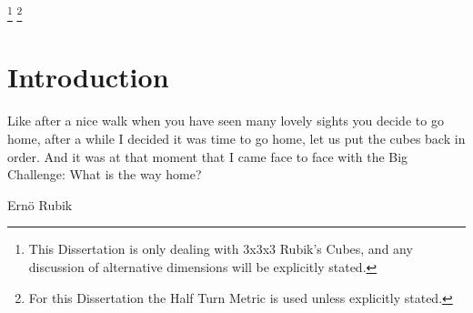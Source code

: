 \documentclass{report}
\newcommand{\tbo}[1]{\textbf{#1}}
\begin{document}
	\textcolor{white}{
		\footnote{\label{footnote:cube}This Dissertation is only dealing with 3x3x3 Rubik's Cubes, and any discussion of alternative dimensions will be explicitly stated.}
		\footnote{\label{footnote:metric}For this Dissertation the Half Turn Metric is used unless explicitly stated.}		
	}

	\newpage
	\tableofcontents
   	\listoffigures
	\listoftables
	\newpage

	\renewcommand{\thechapter}{\arabic{chapter}}
	\setcounter{chapter}{0}
	\chapter{Introduction}
	\epigraph{Like after a nice walk when you have seen many lovely sights you decide to go home, after a while I decided it was time to go home, let us put the cubes back in order. And it was at that moment that I came face to face with the Big Challenge: What is the way home?}{Ern\"{o} Rubik \cite{Rubik1986}}
	
\end{document}
